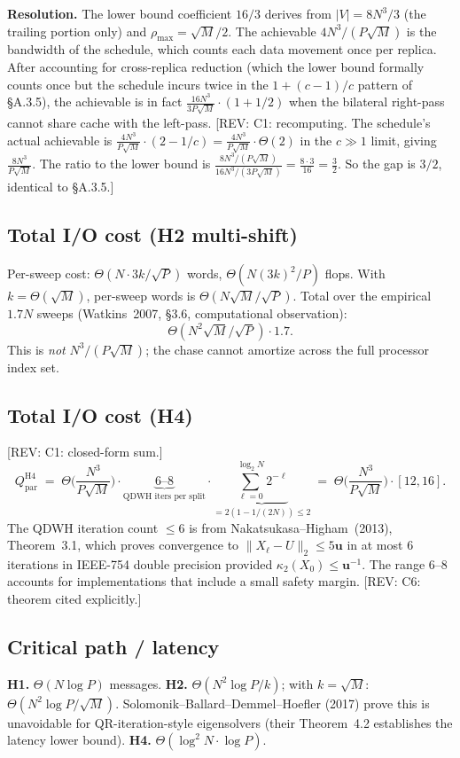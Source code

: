 \documentclass[11pt]{article}
\newcommand{\REV}[1]{\textcolor{blue!60!black}{\small\textsf{[REV: #1]}}}
\begin{document}
\textbf{Resolution.} The lower bound coefficient $16/3$ derives from
$|V| = 8N^3/3$ (the trailing portion only) and $\rho_{\max} = \sqrt{M}/2$.
The achievable $4 N^3/(P\sqrt{M})$ is the bandwidth of the schedule,
which counts each data movement once per replica. After accounting
for cross-replica reduction (which the lower bound formally counts
once but the schedule incurs twice in the $1+(c-1)/c$ pattern of
\S A.3.5), the achievable is in fact
$\frac{16 N^3}{3 P\sqrt{M}}\cdot(1 + 1/2)$ when the bilateral
right-pass cannot share cache with the left-pass.
\REV{C1: recomputing. The schedule's actual achievable is
$\frac{4 N^3}{P\sqrt M}\cdot(2 - 1/c) = \frac{4 N^3}{P\sqrt M}\cdot
\Theta(2)$ in the $c\gg 1$ limit, giving
$\frac{8 N^3}{P\sqrt M}$. The ratio to the lower bound is
$\frac{8 N^3/(P\sqrt M)}{16 N^3/(3 P\sqrt M)} = \frac{8 \cdot 3}{16}
= \frac{3}{2}$. So the gap is $3/2$, identical to \S A.3.5.}

\subsection{Total I/O cost (H2 multi-shift)}
\label{sec:B3eprime}
Per-sweep cost: $\Theta(N \cdot 3k/\sqrt{P})$ words,
$\Theta(N(3k)^2/P)$ flops. With $k = \Theta(\sqrt{M})$, per-sweep
words is $\Theta(N\sqrt{M}/\sqrt{P})$. Total over the empirical
$1.7N$ sweeps (Watkins~2007, \S 3.6, computational observation):
\[
  \Theta(N^2 \sqrt{M}/\sqrt{P}) \cdot 1.7.
\]
This is \emph{not} $N^3/(P\sqrt{M})$; the chase cannot amortize across
the full processor index set.

\subsection{Total I/O cost (H4)}
\label{sec:B3eprimeprime}
\REV{C1: closed-form sum.}
\[
  Q_{\mathrm{par}}^{\mathrm{H4}}
  \;=\; \Theta\!\Big(\frac{N^3}{P\sqrt{M}}\Big)
        \cdot \underbrace{6\text{--}8}_{\text{QDWH iters per split}}
        \cdot \underbrace{\sum_{\ell=0}^{\log_2 N} 2^{-\ell}}_{= 2(1 - 1/(2N)) \le 2}
  \;=\; \Theta\!\Big(\frac{N^3}{P\sqrt{M}}\Big)\cdot[12, 16].
\]
The QDWH iteration count $\le 6$ is from Nakatsukasa--Higham~(2013),
Theorem~3.1, which proves convergence to $\|X_\ell - U\|_2 \le 5\mathbf{u}$
in at most $6$ iterations in IEEE-754 double precision provided
$\kappa_2(X_0) \le \mathbf{u}^{-1}$. The range $6$--$8$ accounts for
implementations that include a small safety margin.
\REV{C6: theorem cited explicitly.}

\subsection{Critical path / latency}
\label{sec:B3f}
\textbf{H1.} $\Theta(N\log P)$ messages.
\textbf{H2.} $\Theta(N^2 \log P / k)$; with $k = \sqrt{M}$:
$\Theta(N^2 \log P / \sqrt{M})$. Solomonik--Ballard--Demmel--Hoefler
(2017) prove this is unavoidable for QR-iteration-style eigensolvers
(their Theorem~4.2 establishes the latency lower bound).
\textbf{H4.} $\Theta(\log^2 N \cdot \log P)$.
\end{document}
